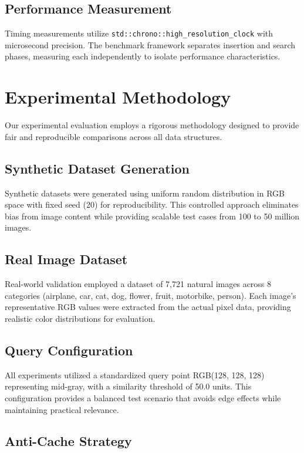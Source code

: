 \documentclass{sbc2023}
\begin{document}
\subsection{Performance Measurement}

Timing measurements utilize \texttt{std::chrono::high\_resolution\_clock} with microsecond precision. The benchmark framework separates insertion and search phases, measuring each independently to isolate performance characteristics.

\section{Experimental Methodology}
\label{sec:methodology}

Our experimental evaluation employs a rigorous methodology designed to provide fair and reproducible comparisons across all data structures.

\subsection{Synthetic Dataset Generation}

Synthetic datasets were generated using uniform random distribution in RGB space with fixed seed (20) for reproducibility. This controlled approach eliminates bias from image content while providing scalable test cases from 100 to 50 million images.

\subsection{Real Image Dataset}

Real-world validation employed a dataset of 7,721 natural images across 8 categories (airplane, car, cat, dog, flower, fruit, motorbike, person). Each image's representative RGB values were extracted from the actual pixel data, providing realistic color distributions for evaluation.

\subsection{Query Configuration}

All experiments utilized a standardized query point RGB(128, 128, 128) representing mid-gray, with a similarity threshold of 50.0 units. This configuration provides a balanced test scenario that avoids edge effects while maintaining practical relevance.

\subsection{Anti-Cache Strategy}
\end{document}

